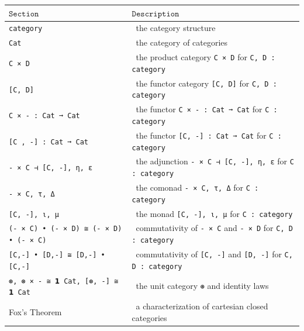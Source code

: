 \documentclass{book}
\newcounter{sectioncount}
\newcounter{subsectioncount}
\renewcommand{\section}[1]{\newpage
\ \\
\ \\
 \begin{center} \scalebox{1.5}{\texttt{\thesectioncount . #1}} \setcounter{sectioncount}{\thesectioncount+1} \setcounter{subsectioncount}{1} \end{center}
 \begin{center}

\ \\
\ \\

\thispagestyle{empty}
\end{center}
}
\begin{document}
{
\small
\begin{center}
\begin{tabular}{|l | l |} 
 \hline
 $\texttt{Section}$ & $\texttt{Description}$ \\
 \hline \hline
 \texttt{category} &\ the category structure \\ 
 \hline
 \texttt{Cat} &\ the category of categories \\
 \hline
 \texttt{C × D} &\ the product category \texttt{C × D} for \texttt{C, D : category} \\
 \hline
 \texttt{[C, D]} &\ the functor category \texttt{[C, D]} for \texttt{C, D : category} \\
 \hline 
 \texttt{C × - : Cat ➞ Cat} &\ the functor \texttt{C × - : Cat ➞ Cat} for \texttt{C : category}\\
 \hline
 \texttt{[C , -] : Cat ➞ Cat} &\ the functor \texttt{[C, -] : Cat ➞ Cat} for \texttt{C : category}  \\ 
 \hline
 \texttt{- × C ⊣ [C, -], η, ε} &\ the adjunction \texttt{- × C ⊣ [C, -], η, ε} for \texttt{C : category} \\
 \hline
 \texttt{- × C, τ, Δ} &\ the comonad \texttt{- × C, τ, Δ} for \texttt{C : category}  \\
 \hline
 \texttt{[C, -], ι, μ} &\ the monad \texttt{[C, -], ι, μ} for \texttt{C : category}  \\
 \hline
 \texttt{(- × C) • (- × D) ≅ (- × D) • (- × C)} &\ commutativity of \texttt{- × C} and \texttt{- × D} for \texttt{C, D : category} \\
 \hline 
 \texttt{[C,-] • [D,-] ≅ [D,-] • [C,-]} &\ commutativity of \texttt{[C, -]} and \texttt{[D, -]} for \texttt{C, D : category} \\
 \hline
 \texttt{⊛, ⊛ × - ≅ 𝟭 Cat, [⊛, -] ≅ 𝟭 Cat} &\ the unit category \texttt{⊛} and identity laws \\
 \hline
 Fox's Theorem &\ a characterization of cartesian closed categories \\
 \hline
\end{tabular}
\end{center}
}

\section{\texttt{category}}
\end{document}
